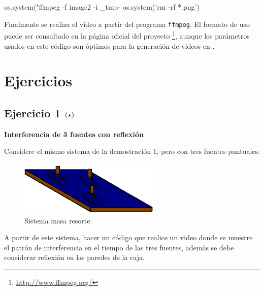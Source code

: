 \begin{listing}[style=python, numbers = none]
os.system("ffmpeg -f image2 -i _tmp-%
os.system('rm -rf *.png')
\end{listing}
Finalmente se realiza el video a partir del programa \texttt{ffmpeg}. El 
formato de uso puede ser consultado en la página oficial del proyecto 
\footnote{\url{http://www.ffmpeg.org/}}, aunque los parámetros usados en
este código son óptimos para la generación de videos en \python.




\newpage
\section{Ejercicios}
\label{sec:ejercicios}

\subsection*{Ejercicio 1 \large{$\left( \star \right)$}}

\textbf{Interferencia de 3 fuentes con reflexión}

Considere el mismo sistema de la demostración 1, pero con tres fuentes 
puntuales. 
\begin{figure}[htbp]
	\centering
	\includegraphics[width=0.60\textwidth]
	{./pictures/interference_reflex.png}

	\caption{\small{Sistema masa resorte.}}
	
	\label{fig:mass_spring}
\end{figure}

A partir de este sistema, hacer un código que realice un video donde se
muestre el patrón de interferencia en el tiempo de las tres fuentes, además
se debe considerar reflexión en las paredes de la caja. 

